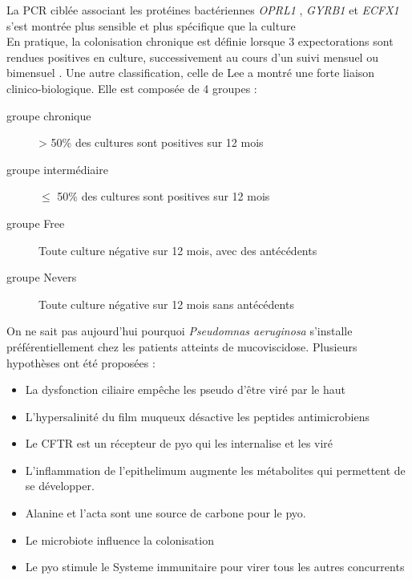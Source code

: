 \documentclass[12pt,a4paper]{article}
\begin{document}
La PCR ciblée associant les protéines bactériennes \textit{OPRL1} , \textit{GYRB1} et \textit{ECFX1}  s’est montrée plus sensible et plus spécifique que la culture\cite{Vongthilath2017,LeGall} \\
En pratique, la colonisation chronique est définie lorsque 3 expectorations sont rendues positives en culture, successivement au cours d’un suivi mensuel ou bimensuel \cite{LeBourgeois}.
Une autre classification, celle de Lee\cite{Lee2003} a montré une forte liaison clinico-biologique. Elle est composée de 4 groupes :  
\begin{description}
\item[groupe chronique] > 50\% des cultures sont positives sur 12 mois
\item[groupe intermédiaire] $\leq$ 50\% des cultures sont positives sur  12 mois
\item[groupe Free] Toute culture négative sur 12 mois, avec des antécédents
\item[groupe Nevers] Toute culture négative sur 12 mois sans antécédents 
\end{description}

On ne sait pas aujourd’hui pourquoi \textit{Pseudomnas aeruginosa} s’installe préférentiellement chez les patients atteints de mucoviscidose. Plusieurs hypothèses ont été proposées : 

\begin{itemize}
\item La dysfonction ciliaire empêche les pseudo d’être viré par le haut
\item L’hypersalinité du film muqueux désactive les peptides antimicrobiens
\item Le CFTR est un récepteur de pyo qui les internalise et les viré
\item L’inflammation de  l’epithelimum augmente les métabolites qui permettent de se développer.
\item Alanine et l’acta sont une source de carbone pour le pyo.
\item Le microbiote influence la colonisation
\item Le pyo stimule le Systeme immunitaire pour virer tous les autres concurrents 
\end{itemize}
\end{document}
